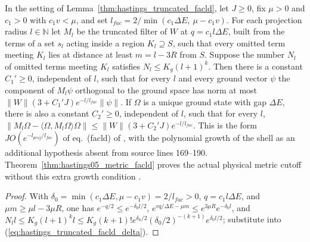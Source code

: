 \begin{lemma}
    \label{thm:hastings_truncated_facld_decay}
    \leanok
    In the setting of Lemma~\ref{thm:hastings_truncated_facld}, let $J\ge0$,
    fix $\mu>0$ and $c_1>0$ with $c_1v<\mu$, and set
    $l_{fac}=2/\min(c_1\Delta E,\ \mu-c_1v)$. For each projection radius
    $l\in\mathbb{N}$ let $M_l$ be the truncated filter of $W$ at
    $q=c_1l\Delta E$, built from the terms of a set $s_l$ acting inside a
    region $K_l\supseteq S$, such that every omitted term meeting $K_l$ lies at
    distance at least $m=l-3R$ from $S$. Suppose the number $N_l$ of omitted
    terms meeting $K_l$ satisfies $N_l\le K_g(l+1)^k$. Then there is a constant
    $C_1'\ge0$, independent of $l$, such that for every $l$ and every ground
    vector $\psi$ the component of $M_l\psi$ orthogonal to the ground space
    has norm at most $\|W\|(3+C_1'J)e^{-l/l_{fac}}\|\psi\|$.
    If $\Omega$ is a unique ground state with gap $\Delta E$, there is also a
    constant $C_2'\ge0$, independent of $l$, such that for every $l$,
    $\|M_l\Omega-\langle\Omega,M_l\Omega\rangle\Omega\|\le
        \|W\|(3+C_2'J)e^{-l/l_{fac}}$. This is the form $JO(e^{-l_{proj}/l_{fac}})$
    of eq.~(facld) of \cite[lines 322--349]{Hastings2006Solving}, with the
    polynomial growth of the shell as an additional hypothesis absent from
    source lines 169--190. Theorem~\ref{thm:hastings05_metric_facld} proves
    the actual physical metric cutoff without this extra growth condition
    \cite{gap:hastings05_truncated_dynamics,gap:hastings05_geometric_growth_scope}.
\end{lemma}
\begin{proof}
    \leanok
    With $\delta_0=\min(c_1\Delta E,\mu-c_1v)=2/l_{fac}>0$, $q=c_1l\Delta E$, and
    $\mu m\ge\mu l-3\mu R$, one has $e^{-q/2}\le e^{-\delta_0l/2}$,
    $e^{vq/\Delta E-\mu m}\le e^{3\mu R}e^{-\delta_0l}$, and
    $N_ll\le K_g(l+1)^kl\le K_g(k+1)!e^{\delta_0/2}(\delta_0/2)^{-(k+1)}e^{\delta_0l/2}$;
    substitute into (\ref{eq:hastings_truncated_facld_delta}).
\end{proof}

